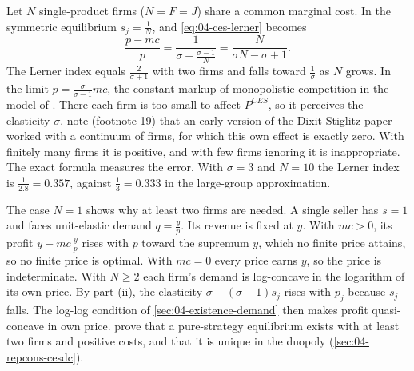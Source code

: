  Let $N$ single-product firms ($N = F = J$) share a common
marginal cost. In the symmetric equilibrium $s_j = \frac{1}{N}$, and \eqref{eq:04-ces-lerner} becomes
\begin{equation}\label{eq:04-ces-symmetric}
\frac{p - mc}{p} = \frac{1}{\sigma - \frac{\sigma - 1}{N}} = \frac{N}{\sigma N - \sigma + 1}.
\end{equation}
The Lerner index equals $\frac{2}{\sigma + 1}$ with two firms and falls toward $\frac{1}{\sigma}$ as $N$ grows. In the
limit $p = \frac{\sigma}{\sigma - 1}mc$, the constant markup of monopolistic competition in the model of
\citet{DixitStiglitz1977}. There each firm is too small to affect $P^{CES}$, so it perceives the elasticity $\sigma$.
 note (footnote 19) that an early version of the Dixit-Stiglitz paper worked with a
continuum of firms, for which this own effect is exactly zero. With finitely many firms it is positive, and
with few firms ignoring it is inappropriate. The exact formula measures the error. With $\sigma = 3$ and $N = 10$
the Lerner index is $\frac{1}{2.8} = 0.357$, against $\frac{1}{3} = 0.333$ in the large-group approximation.

The case $N = 1$ shows why at least two firms are needed. A single seller has $s = 1$ and faces unit-elastic demand
$q = \frac{y}{p}$. Its revenue is fixed at $y$. With $mc > 0$, its profit $y - mc\,\frac{y}{p}$ rises with $p$ toward
the supremum $y$, which no finite price attains, so no finite price is optimal. With $mc = 0$ every price earns $y$,
so the price is indeterminate. With $N \ge 2$ each firm's demand is log-concave in the logarithm of its own price.
By part (ii), the elasticity $\sigma - (\sigma - 1)s_j$ rises with $p_j$ because $s_j$ falls. The log-log
condition of \cref{sec:04-existence-demand} then makes profit quasi-concave in own price. 
prove that a pure-strategy equilibrium exists with at least two firms and positive costs, and that it is unique in
the duopoly (\cref{sec:04-repcons-cesdc}).

